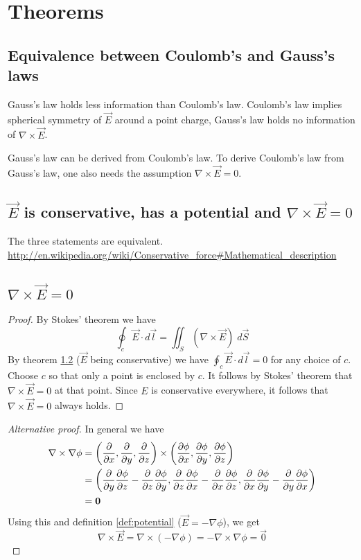 \section{Theorems}


\subsection{Equivalence between Coulomb's and Gauss's laws}
\label{thm:coulomb-gauss}
Gauss's law holds less information than Coulomb's law. Coulomb's law
implies spherical symmetry of $\vec{E}$ around a point charge, Gauss's
law holds no information of $\nabla\times\vec{E}$.

Gauss's law can be derived from Coulomb's law. To derive Coulomb's law
from Gauss's law, one also needs the assumption $\nabla\times\vec{E}=0$.


\subsection{$\vec{E}$ is conservative, has a potential and
  $\nabla\times\vec{E}=0$}
\label{thm:conservative}
The three statements are equivalent. \url{http://en.wikipedia.org/wiki/Conservative_force#Mathematical_description}


\subsection{$\nabla\times\vec{E} = 0$}
\begin{proof}
  By Stokes' theorem we have
  \begin{equation*}
    \oint_c \vec{E}\cdot d\vec{l} = \iint_S (\nabla\times\vec{E})\;d\vec{S}
  \end{equation*}
  By theorem \ref{thm:conservative} ($\vec{E}$ being conservative) we
  have $\oint_c \vec{E}\cdot d\vec{l} = 0$ for any choice of $c$. Choose
  $c$ so that only a point is enclosed by $c$. It follows by Stokes'
  theorem that $\nabla\times\vec{E}=0$ at that point. Since $E$ is
  conservative everywhere, it follows that $\nabla\times\vec{E}=0$
  always holds.
\end{proof}

\begin{proof}[Alternative proof]
  In general we have
  \begin{align*}
    \nabla\times\nabla\phi &= \left(\frac{\partial}{\partial x},\frac{\partial}{\partial y},\frac{\partial}{\partial z}\right)\times\left(\frac{\partial \phi}{\partial x},
    \frac{\partial \phi}{\partial y}, \frac{\partial \phi}{\partial z}\right) \\
    &= \left(
         \frac{\partial}{\partial y}\frac{\partial \phi}{\partial z}-\frac{\partial}{\partial z}\frac{\partial \phi}{\partial y},
         \frac{\partial}{\partial z}\frac{\partial \phi}{\partial x}-\frac{\partial}{\partial x}\frac{\partial \phi}{\partial z},
         \frac{\partial}{\partial x}\frac{\partial \phi}{\partial y}-\frac{\partial}{\partial y}\frac{\partial \phi}{\partial x}
       \right) \\
    &= \boldsymbol{0}
  \end{align*}
  Using this and definition \ref{def:potential} ($\vec{E} = - \nabla\phi$),
  we get
  \begin{equation*}
    \nabla\times\vec{E} = \nabla\times(-\nabla\phi) =
    -\nabla\times\nabla\phi = \vec{0}
  \end{equation*}
\end{proof}


